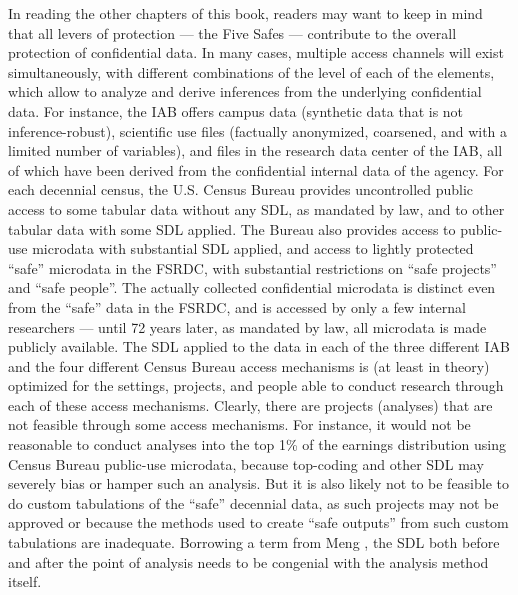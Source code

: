 In reading the other chapters of this book, readers may want to keep in mind that all levers of protection --- the Five Safes --- contribute to the overall protection of confidential data. In many cases,   multiple access channels will exist simultaneously, with different combinations of the level of each of the elements, which allow to analyze and derive inferences from the underlying confidential data. For instance,  the \ac{IAB} offers campus data (synthetic data that is not inference-robust), scientific use files (factually anonymized, coarsened, and with a limited number of variables), and files in the research data center of the IAB, all of which have been derived from the confidential internal data of the agency. For each decennial census, the U.S. Census Bureau provides uncontrolled public access to some tabular data without any \ac{SDL}, as mandated by law, and to other tabular data with some \ac{SDL} applied. The Bureau also provides access to public-use microdata with substantial \ac{SDL} applied, and access to lightly protected ``safe'' microdata in the \ac{FSRDC}, with substantial restrictions on ``safe projects'' and ``safe people''. The actually collected confidential microdata is distinct even from the ``safe'' data in the FSRDC, and is accessed by only a few internal researchers --- until 72 years later, as mandated by law, all microdata is made publicly available. The \ac{SDL} applied to the data in each of the three different IAB and the four different Census Bureau access mechanisms is (at least in theory) optimized for the settings, projects, and people able to conduct research through each of these access mechanisms. Clearly, there are projects (analyses) that are not feasible through some access mechanisms. For instance, it would not be reasonable to conduct analyses into the top 1\% of the earnings distribution using Census Bureau public-use microdata, because top-coding and other \ac{SDL} may severely bias or hamper such an analysis. But it is also likely not to be feasible to do custom tabulations of the ``safe'' decennial data, as such projects may not be approved or because the methods used to create ``safe outputs'' from such custom tabulations are inadequate. Borrowing a term from Meng  \cite{meng-congenial}, the \ac{SDL} both before and after the point of analysis needs to be congenial with the analysis method itself.

